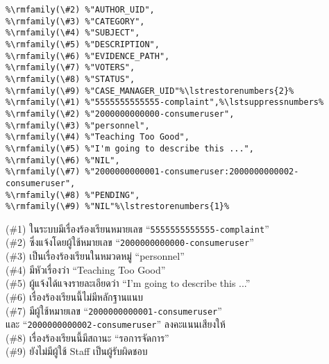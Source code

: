 \begin{minipage}{\textwidth}

\begin{lstlisting}[caption={\texttt{data/issues/complaints/complaints.csv}},breakatwhitespace=false,breaklines=false]
%\rmfamily(\#1) %"COMPLAINT_ID",%\lstsuppressnumbers%
%\rmfamily(\#2) %"AUTHOR_UID",
%\rmfamily(\#3) %"CATEGORY",
%\rmfamily(\#4) %"SUBJECT",
%\rmfamily(\#5) %"DESCRIPTION",
%\rmfamily(\#6) %"EVIDENCE_PATH",
%\rmfamily(\#7) %"VOTERS",
%\rmfamily(\#8) %"STATUS",
%\rmfamily(\#9) %"CASE_MANAGER_UID"%\lstrestorenumbers{2}%
%\rmfamily(\#1) %"5555555555555-complaint",%\lstsuppressnumbers%
%\rmfamily(\#2) %"2000000000000-consumeruser",
%\rmfamily(\#3) %"personnel",
%\rmfamily(\#4) %"Teaching Too Good",
%\rmfamily(\#5) %"I'm going to describe this ...",
%\rmfamily(\#6) %"NIL",
%\rmfamily(\#7) %"2000000000001-consumeruser:2000000000002-consumeruser",
%\rmfamily(\#8) %"PENDING",
%\rmfamily(\#9) %"NIL"%\lstrestorenumbers{1}%
\end{lstlisting}

\begin{description}[labelwidth=*]
    \item[$ \Rightarrow $] (\#1) ในระบบมีเรื่องร้องเรียนหมายเลข ``\texttt{5555555555555-complaint}''\\
(\#2) ซึ่งแจ้งโดยผู้ใช้หมายเลข ``\texttt{2000000000000-consumeruser}''\\
(\#3) เป็นเรื่องร้องเรียนในหมวดหมู่ ``personnel''\\
(\#4) มีหัวเรื่องว่า ``Teaching Too Good''\\
(\#5) ผู้แจ้งได้แจงรายละเอียดว่า ``I'm going to describe this ...''\\
(\#6) เรื่องร้องเรียนนี้ไม่มีหลักฐานแนบ\\
(\#7) มีผู้ใช้หมายเลข ``\texttt{2000000000001-consumeruser}''\\
\hspace{4ex}และ ``\texttt{2000000000002-consumeruser}'' ลงคะแนนเสียงให้\\
(\#8) เรื่องร้องเรียนนี้มีสถานะ ``รอการจัดการ''\\
(\#9) ยังไม่มีผู้ใช้ Staff เป็นผู้รับผิดชอบ
\end{description}
\end{minipage}

\pagebreak[4]

\vspace{3\baselineskip}


